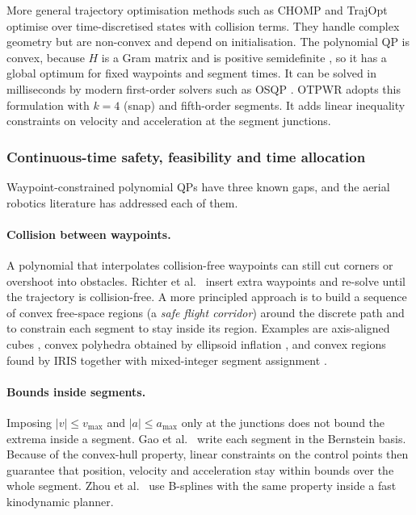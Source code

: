 \documentclass[11pt,a4paper]{article}
\begin{document}
More general trajectory optimisation methods such as CHOMP
\citep{ratliff2009chomp} and TrajOpt \citep{schulman2014motion} optimise over
time-discretised states with collision terms. They handle complex geometry
but are non-convex and depend on initialisation. The polynomial QP is convex,
because $H$ is a Gram matrix and is positive semidefinite
\citep{boyd2004convex}, so it has a global optimum for fixed waypoints and
segment times. It can be solved in milliseconds by modern first-order solvers
such as OSQP \citep{stellato2020osqp}. OTPWR adopts this formulation with
$k=4$ (snap) and fifth-order segments. It adds linear inequality constraints
on velocity and acceleration at the segment junctions.

\subsubsection{Continuous-time safety, feasibility and time allocation}
\label{sec:lit-safe}

Waypoint-constrained polynomial QPs have three known gaps, and the aerial
robotics literature has addressed each of them.

\paragraph{Collision between waypoints.} A polynomial that interpolates
collision-free waypoints can still cut corners or overshoot into obstacles.
Richter et al.\ \citep{richter2016polynomial} insert extra waypoints and
re-solve until the trajectory is collision-free. A more principled approach
is to build a sequence of convex free-space regions (a \emph{safe flight
corridor}) around the discrete path and to constrain each segment to stay
inside its region. Examples are axis-aligned cubes \citep{chen2016online},
convex polyhedra obtained by ellipsoid inflation \citep{liu2017planning}, and
convex regions found by IRIS together with mixed-integer segment assignment
\citep{deits2015efficient}.

\paragraph{Bounds inside segments.} Imposing $|v|\le v_{\max}$ and
$|a|\le a_{\max}$ only at the junctions does not bound the extrema inside a
segment. Gao et al.\ \citep{gao2018online} write each segment in the
Bernstein basis. Because of the convex-hull property, linear constraints on
the control points then guarantee that position, velocity and acceleration
stay within bounds over the whole segment. Zhou et al.\
\citep{zhou2019robust} use B-splines with the same property inside a fast
kinodynamic planner.
\end{document}
